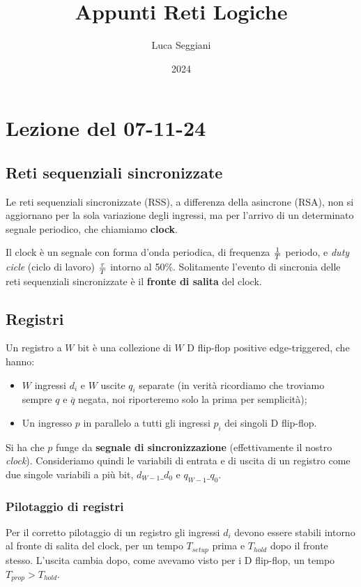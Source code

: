 \documentclass[a4paper,11pt]{article}
\title{Appunti Reti Logiche}
\author{Luca Seggiani}
\date{2024}
\begin{document}
\section{Lezione del 07-11-24}

\thispagestyle{empty}
\pagestyle{fancy}

\subsection{Reti sequenziali sincronizzate}
Le reti sequenziali sincronizzate (RSS), a differenza della asincrone (RSA), non si aggiornano per la sola variazione degli ingressi, ma per l'arrivo di un determinato segnale periodico, che chiamiamo \textbf{clock}.

Il clock è un segnale con forma d'onda periodica, di frequenza $1 \over T$ periodo, e \textit{duty cicle} (ciclo di lavoro) $\tau \over T$ intorno al 50\%.
Solitamente l'evento di sincronia delle reti sequenziali sincronizzate è il \textbf{fronte di salita} del clock.

\subsection{Registri}
Un registro a $W$ bit è una collezione di $W$ D flip-flop positive edge-triggered, che hanno:
\begin{itemize}
	\item $W$ ingressi $d_i$ e $W$ uscite $q_i$ separate (in verità ricordiamo che troviamo sempre $q$ e $\overline{q}$ negata, noi riporteremo solo la prima per semplicità);
	\item Un ingresso $p$ in parallelo a tutti gli ingressi $p_i$ dei singoli D flip-flop.
\end{itemize}

Si ha che $p$ funge da \textbf{segnale di sincronizzazione} (effettivamente il nostro \textit{clock}).
Consideriamo quindi le variabili di entrata e di uscita di un registro come due singole variabili a più bit, $d_{W-1}\_d_0$ e $q_{W-1}\_q_0$.

\subsubsection{Pilotaggio di registri}
Per il corretto pilotaggio di un registro gli ingressi $d_i$ devono essere stabili intorno al fronte di salita del clock, per un tempo $T_{setup}$ prima e $T_{hold}$ dopo il fronte stesso.
L'uscita cambia dopo, come avevamo visto per i D flip-flop, un tempo $T_{prop} > T_{hold}$.
\end{document}
